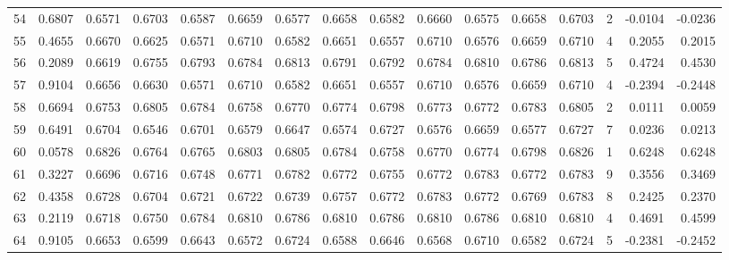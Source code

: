 \begin{tabular}{lrrrrrrrrrrrrrrr}
54  &      0.6807 &  0.6571 &  0.6703 &  0.6587 &  0.6659 &  0.6577 &  0.6658 &  0.6582 &  0.6660 &  0.6575 &   0.6658 &     0.6703 &      2 &                   -0.0104 &                    -0.0236 \\
55  &      0.4655 &  0.6670 &  0.6625 &  0.6571 &  0.6710 &  0.6582 &  0.6651 &  0.6557 &  0.6710 &  0.6576 &   0.6659 &     0.6710 &      4 &                    0.2055 &                     0.2015 \\
56  &      0.2089 &  0.6619 &  0.6755 &  0.6793 &  0.6784 &  0.6813 &  0.6791 &  0.6792 &  0.6784 &  0.6810 &   0.6786 &     0.6813 &      5 &                    0.4724 &                     0.4530 \\
57  &      0.9104 &  0.6656 &  0.6630 &  0.6571 &  0.6710 &  0.6582 &  0.6651 &  0.6557 &  0.6710 &  0.6576 &   0.6659 &     0.6710 &      4 &                   -0.2394 &                    -0.2448 \\
58  &      0.6694 &  0.6753 &  0.6805 &  0.6784 &  0.6758 &  0.6770 &  0.6774 &  0.6798 &  0.6773 &  0.6772 &   0.6783 &     0.6805 &      2 &                    0.0111 &                     0.0059 \\
59  &      0.6491 &  0.6704 &  0.6546 &  0.6701 &  0.6579 &  0.6647 &  0.6574 &  0.6727 &  0.6576 &  0.6659 &   0.6577 &     0.6727 &      7 &                    0.0236 &                     0.0213 \\
60  &      0.0578 &  0.6826 &  0.6764 &  0.6765 &  0.6803 &  0.6805 &  0.6784 &  0.6758 &  0.6770 &  0.6774 &   0.6798 &     0.6826 &      1 &                    0.6248 &                     0.6248 \\
61  &      0.3227 &  0.6696 &  0.6716 &  0.6748 &  0.6771 &  0.6782 &  0.6772 &  0.6755 &  0.6772 &  0.6783 &   0.6772 &     0.6783 &      9 &                    0.3556 &                     0.3469 \\
62  &      0.4358 &  0.6728 &  0.6704 &  0.6721 &  0.6722 &  0.6739 &  0.6757 &  0.6772 &  0.6783 &  0.6772 &   0.6769 &     0.6783 &      8 &                    0.2425 &                     0.2370 \\
63  &      0.2119 &  0.6718 &  0.6750 &  0.6784 &  0.6810 &  0.6786 &  0.6810 &  0.6786 &  0.6810 &  0.6786 &   0.6810 &     0.6810 &      4 &                    0.4691 &                     0.4599 \\
64  &      0.9105 &  0.6653 &  0.6599 &  0.6643 &  0.6572 &  0.6724 &  0.6588 &  0.6646 &  0.6568 &  0.6710 &   0.6582 &     0.6724 &      5 &                   -0.2381 &                    -0.2452 \\

\end{tabular}
